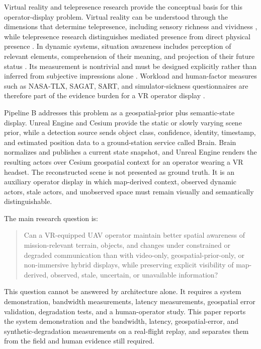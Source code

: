 \documentclass[fleqn]{VRIH2025}
\begin{document}
Virtual reality and telepresence research provide the conceptual basis for this operator-display problem. Virtual reality can be understood through the dimensions that determine telepresence, including sensory richness and vividness \cite{steuer1992vr}, while telepresence research distinguishes mediated presence from direct physical presence \cite{sheridan1992telepresence}. In dynamic systems, situation awareness includes perception of relevant elements, comprehension of their meaning, and projection of their future status \cite{endsley1995theory}. Its measurement is nontrivial and must be designed explicitly rather than inferred from subjective impressions alone \cite{endsley1995measurement,moens2026meta}. Workload and human-factor measures such as NASA-TLX, SAGAT, SART, and simulator-sickness questionnaires are therefore part of the evidence burden for a VR operator display \cite{hart1988tlx,hart2006tlx,endsley1998sagat_sart,kennedy1993ssq}.

Pipeline B addresses this problem as a geospatial-prior plus semantic-state display. Unreal Engine and Cesium provide the static or slowly varying scene prior, while a detection source sends object class, confidence, identity, timestamp, and estimated position data to a ground-station service called Brain. Brain normalizes and publishes a current state snapshot, and Unreal Engine renders the resulting actors over Cesium geospatial context for an operator wearing a VR headset. The reconstructed scene is not presented as ground truth. It is an auxiliary operator display in which map-derived context, observed dynamic actors, stale actors, and unobserved space must remain visually and semantically distinguishable.

The main research question is:

\begin{quote}
Can a VR-equipped UAV operator maintain better spatial awareness of mission-relevant terrain, objects, and changes under constrained or degraded communication than with video-only, geospatial-prior-only, or non-immersive hybrid displays, while preserving explicit visibility of map-derived, observed, stale, uncertain, or unavailable information?
\end{quote}

This question cannot be answered by architecture alone. It requires a system demonstration, bandwidth measurements, latency measurements, geospatial error validation, degradation tests, and a human-operator study. This paper reports the system demonstration and the bandwidth, latency, geospatial-error, and synthetic-degradation measurements on a real-flight replay, and separates them from the field and human evidence still required.
\end{document}
